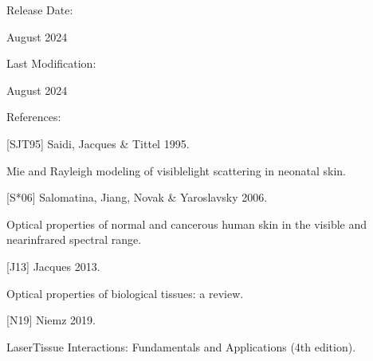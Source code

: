 \documentclass[letterpaper,10pt,english]{sphinxmanual}
\begin{document}
\begin{DUlineblock}{0em}
\item[] Release Date:
\item[] August 2024
\item[] Last Modification:
\item[] August 2024
\end{DUlineblock}

\begin{DUlineblock}{0em}
\item[] References:
\end{DUlineblock}

\begin{DUlineblock}{0em}
\item[] {[}SJT95{]} Saidi, Jacques \& Tittel 1995.
\item[] Mie and Rayleigh modeling of visible\sphinxhyphen{}light scattering in neonatal skin.
\item[] 
\end{DUlineblock}

\begin{DUlineblock}{0em}
\item[] {[}S*06{]} Salomatina, Jiang, Novak \& Yaroslavsky 2006.
\item[] Optical properties of normal and cancerous human skin in the visible and near\sphinxhyphen{}infrared spectral range.
\item[] 
\end{DUlineblock}

\begin{DUlineblock}{0em}
\item[] {[}J13{]} Jacques 2013.
\item[] Optical properties of biological tissues: a review.
\item[] 
\end{DUlineblock}

\begin{DUlineblock}{0em}
\item[] {[}N19{]} Niemz 2019.
\item[] Laser\sphinxhyphen{}Tissue Interactions: Fundamentals and Applications (4th edition).
\item[] 
\end{DUlineblock}
\end{document}
